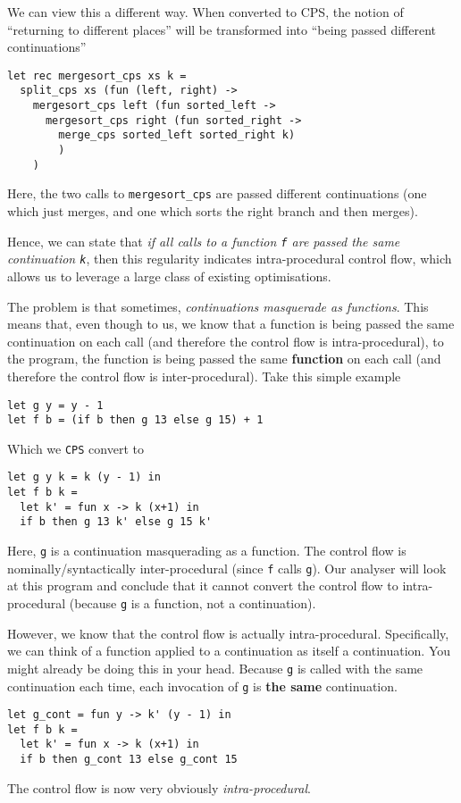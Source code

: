We can view this a different way. When converted to CPS, the notion of ``returning to different places'' will be transformed into ``being passed different continuations''
\begin{verbatim}
let rec mergesort_cps xs k = 
  split_cps xs (fun (left, right) -> 
    mergesort_cps left (fun sorted_left ->
      mergesort_cps right (fun sorted_right ->
        merge_cps sorted_left sorted_right k)
        )
    )
\end{verbatim}
Here, the two calls to \texttt{mergesort\_cps} are passed different continuations (one which just merges, and one which sorts the right branch and then merges).  

Hence, we can state that \textit{if all calls to a function \texttt{f} are passed the same continuation \texttt{k}}, then this regularity indicates intra-procedural control flow, which allows us to leverage a large class of existing optimisations. 

The problem is that sometimes, \textit{continuations masquerade as functions}. This means that, even though to us, we know that a function is being passed the same continuation on each call (and therefore the control flow is intra-procedural), to the program, the function is being passed the same \textbf{function} on each call (and therefore the control flow is inter-procedural). Take this simple example
\begin{verbatim}
let g y = y - 1
let f b = (if b then g 13 else g 15) + 1
\end{verbatim}
Which we \texttt{CPS} convert to
\begin{verbatim}
let g y k = k (y - 1) in
let f b k = 
  let k' = fun x -> k (x+1) in
  if b then g 13 k' else g 15 k'
\end{verbatim}
Here, \texttt{g} is a continuation masquerading as a function. The control flow is nominally/syntactically inter-procedural (since \texttt{f} calls \texttt{g}). Our analyser will look at this program and conclude that it cannot convert the control flow to intra-procedural (because \texttt{g} is a function, not a continuation).

However, we know that the control flow is actually intra-procedural. Specifically, we can think of a function applied to a continuation as itself a continuation. You might already be doing this in your head. Because \texttt{g} is called with the same continuation each time, each invocation of \texttt{g} is \textbf{the same} continuation. 
\begin{verbatim}
let g_cont = fun y -> k' (y - 1) in
let f b k = 
  let k' = fun x -> k (x+1) in
  if b then g_cont 13 else g_cont 15
\end{verbatim}
The control flow is now very obviously \textit{intra-procedural}.

